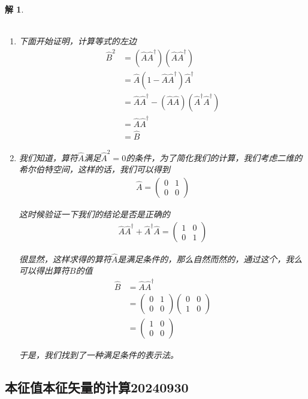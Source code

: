 \documentclass{article}
\newtheorem{solution}{解}
\newcommand{\pmtwo}[4]{
    \begin{pmatrix}
        #1&#2\\
        #3&#4
    \end{pmatrix}
    }
\begin{document}
\begin{solution}
    \ \\ \ 
    \begin{enumerate}
        \item[(1)] 下面开始证明，计算等式的左边
        \begin{align*}
            \hat{B}^2&=(\hat{A}\hat{A}^\dagger)(\hat{A}\hat{A}^\dagger)\\
            &=\hat{A}(1-\hat{A}\hat{A}^\dagger)\hat{A}^\dagger\\
            &=\hat{A}\hat{A}^\dagger-(\hat{A}\hat{A})(\hat{A}^\dagger\hat{A}^\dagger)\\
            &=\hat{A}\hat{A}^\dagger\\
            &=\hat{B}
        \end{align*}
        \item[(2)] 我们知道，算符$\hat{A}$满足$\hat{A}^2=0$的条件，为了简化我们的计算，我们考虑二维的希尔伯特空间，这样的话，我们可以得到
        \begin{align*}
            \hat{A}=\pmtwo{0}{1}{0}{0}
        \end{align*} 
        
        这时候验证一下我们的结论是否是正确的
        \begin{align*}
            \hat{A}\hat{A}^\dagger+\hat{A}^\dagger\hat{A}=\pmtwo{1}{0}{0}{1}
        \end{align*}
        
        很显然，这样求得的算符$\hat{A}$是满足条件的，那么自然而然的，通过这个，我么可以得出算符$B$的值
        \begin{align*}
            \hat{B}&=\hat{A}\hat{A}^\dagger\\
            &=\pmtwo{0}{1}{0}{0}\pmtwo{0}{0}{1}{0}\\
            &=\pmtwo{1}{0}{0}{0}
        \end{align*}
        
        于是，我们找到了一种满足条件的表示法。
    \end{enumerate}
\end{solution}





\subsection{本征值本征矢量的计算20240930}
\end{document}
